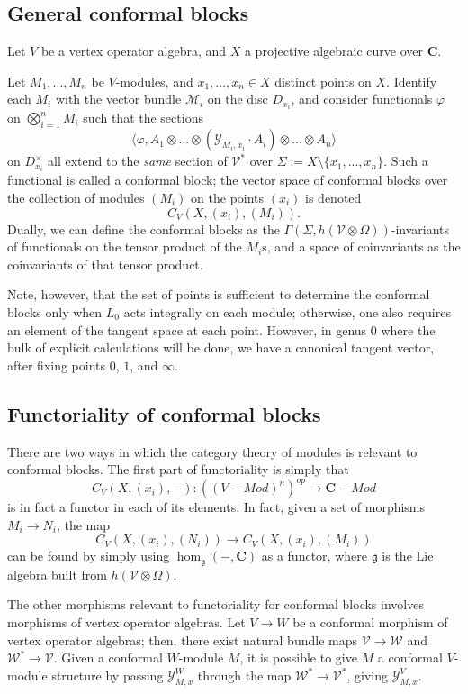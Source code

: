 \documentclass{article}
\newcommand{\CC}{\mathbold{C}}
\newcommand{\Mm}{\mathcal{M}}
\newcommand{\Vv}{\mathcal{V}}
\newcommand{\Ww}{\mathcal{W}}
\newcommand{\Yy}{\mathcal{Y}}
\newcommand{\gf}{\mathfrak{g}}
\begin{document}
\subsection{General conformal blocks}
Let $V$ be a vertex operator algebra, and $X$ a projective algebraic curve over $\CC$.

Let $M_1,...,M_n$ be $V$-modules, and $x_1,...,x_n \in X$ distinct points on $X$.  Identify each $M_i$ with the vector bundle $\Mm_i$ on the disc $D_{x_i}$, and consider functionals $\varphi$ on $\bigotimes_{i=1}^n M_i$ such that the sections
\[\langle \varphi, A_1 \otimes ... \otimes (\Yy_{M_i,x_i} \cdot A_i) \otimes ... \otimes A_n \rangle \]
on $D_{x_i}^\times$ all extend to the \textit{same} section of $\Vv^*$ over $\Sigma:=X \setminus \{x_1,...,x_n\}$.  Such a functional is called a conformal block; the vector space of conformal blocks over the collection of modules $(M_i)$ on the points $(x_i)$ is denoted
\[C_V(X,(x_i),(M_i)). \]
Dually, we can define the conformal blocks as the $\Gamma(\Sigma,h(\Vv \otimes \Omega))$-invariants of functionals on the tensor product of the $M_i$s, and a space of coinvariants as the coinvariants of that tensor product.

Note, however, that the set of points is sufficient to determine the conformal blocks only when $L_0$ acts integrally on each module; otherwise, one also requires an element of the tangent space at each point.  However, in genus $0$ where the bulk of explicit calculations will be done, we have a canonical tangent vector, after fixing points $0$, $1$, and $\infty$.

\subsection{Functoriality of conformal blocks}
There are two ways in which the category theory of modules is relevant to conformal blocks.  The first part of functoriality is simply that 
\[C_V(X,(x_i),-): ((V-Mod)^n)^{op} \rightarrow \CC-Mod \]
is in fact a functor in each of its elements.  In fact, given a set of morphisms $M_i \rightarrow N_i$, the map
\[C_V(X,(x_i),(N_i)) \rightarrow C_V(X,(x_i),(M_i)) \]
can be found by simply using $\hom_\gf(-,\CC)$ as a functor, where $\gf$ is the Lie algebra built from $h(\Vv \otimes \Omega)$.

The other morphisms relevant to functoriality for conformal blocks involves morphisms of vertex operator algebras.  Let $V \rightarrow W$ be a conformal morphism of vertex operator algebras; then, there exist natural bundle maps $\Vv \rightarrow \Ww$ and $\Ww^* \rightarrow \Vv$.  Given a conformal $W$-module $M$, it is possible to give $M$ a conformal $V$-module structure by passing $\Yy^W_{M,x}$ through the map $\Ww^* \rightarrow \Vv^*$, giving $\Yy^V_{M,x}$.
\end{document}
